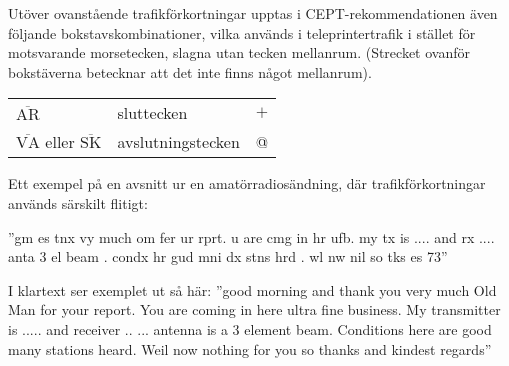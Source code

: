 Utöver ovanstående trafikförkortningar upptas i CEPT-rekommendationen
även följande bokstavskombinationer, vilka används i teleprintertrafik
i stället för motsvarande morsetecken, slagna utan tecken mellanrum.
(Strecket ovanför bokstäverna betecknar att det inte finns något
mellanrum).

\begin{tabular}{lll}
  \(\overline{\mathrm{AR}}\) & sluttecken & \(+\) \\
  \(\overline{\mathrm{VA}}\) eller \(\overline{\mathrm{SK}}\) & avslutningstecken & @ \\
\end{tabular}

Ett exempel på en avsnitt ur en amatörradiosändning, där
trafikförkortningar används särskilt flitigt:

''gm es tnx vy much om fer ur rprt. u are cmg in hr ufb. my tx is
.... and rx .... anta 3 el beam . condx hr gud mni dx stns hrd . wl nw
nil so tks es 73''

I klartext ser exemplet ut så här: ''good morning and thank you very
much Old Man for your report. You are coming in here ultra fine
business. My transmitter is .....  and receiver .. ... antenna is a 3
element beam. Conditions here are good many stations heard. Weil now
nothing for you so thanks and kindest regards''
